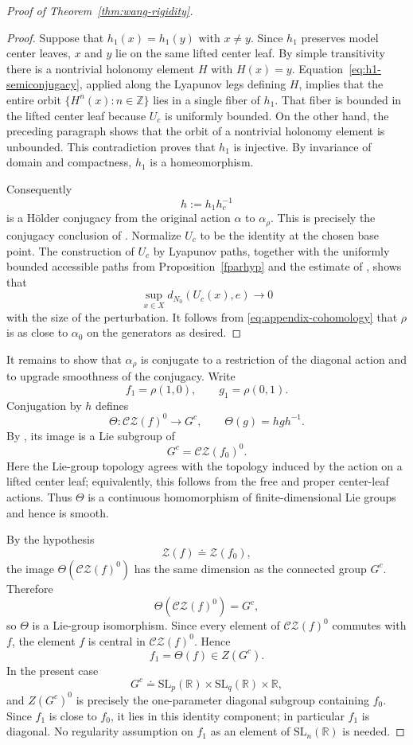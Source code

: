 \documentclass[11pt]{amsart}
\numberwithin{equation}{section}
\newcommand{\CZ}{\mathcal{CZ}}
\newcommand{\SL}{\mathrm{SL}}
\theoremstyle{plain}
\begin{document}
\begin{proof}[Proof of Theorem~\ref{thm:wang-rigidity}]
\begin{proof}
Suppose that $h_1(x)=h_1(y)$ with $x\ne y$.  Since $h_1$ preserves model
center leaves, $x$ and $y$ lie on the same lifted center leaf.  By simple
transitivity there is a nontrivial holonomy element $H$ with $H(x)=y$.
Equation~\eqref{eq:h1-semiconjugacy}, applied along the Lyapunov legs
defining $H$, implies that the entire orbit
$\{H^n(x):n\in\mathbb Z\}$ lies in a single fiber of $h_1$.  That fiber is
bounded in the lifted center leaf because $U_c$ is uniformly bounded.
On the other hand, the preceding paragraph shows that the orbit of a
nontrivial holonomy element is unbounded.  This contradiction proves that
$h_1$ is injective.  By invariance of domain and compactness, $h_1$ is a
homeomorphism.

Consequently
\[
h:=h_1h_c^{-1}
\]
is a H\"older conjugacy from the original action $\alpha$ to
$\alpha_\rho$.  This is precisely the conjugacy conclusion of
\cite[Proposition~6.2]{Wang26}. Normalize $U_c$ to be the
identity at the chosen base point.  The construction of $U_c$ by
Lyapunov paths, together with the uniformly bounded accessible paths from
Proposition~\ref{fparhyp} and the estimate of
\cite[Lemma~6.10]{Wang26}, shows that
\[
\sup_{x\in X}d_{N_0}(U_c(x),e)\longrightarrow0
\]
with the size of the perturbation.  It follows from
\eqref{eq:appendix-cohomology} that $\rho$ is as close to $\alpha_0$ on
the generators as desired.
\end{proof}

It remains to show that $\alpha_\rho$ is conjugate to a restriction of the diagonal action and to upgrade smoothness of the conjugacy.  Write
\[
f_1=\rho(1,0),
\qquad
g_1=\rho(0,1).
\]
Conjugation by $h$ defines
\[
\Theta:\CZ(f)^0\longrightarrow G^c,
\qquad
\Theta(g)=hgh^{-1}.
\]
By \cite[Proposition~6.2]{Wang26}, its image is a Lie subgroup of
\[
G^c=\CZ(f_0)^0.
\]
Here the Lie-group topology agrees with the topology induced by the action
on a lifted center leaf; equivalently, this follows from the free and
proper center-leaf actions.  Thus $\Theta$ is a continuous homomorphism of
finite-dimensional Lie groups and hence is smooth.

By the hypothesis
\[
\mathcal Z(f)\doteq\mathcal Z(f_0),
\]
the image $\Theta(\CZ(f)^0)$ has the same dimension as the connected group
$G^c$.  Therefore
\[
\Theta(\CZ(f)^0)=G^c,
\]
so $\Theta$ is a Lie-group isomorphism.  Since every element of
$\CZ(f)^0$ commutes with $f$, the element $f$ is central in
$\CZ(f)^0$.  Hence
\[
f_1=\Theta(f)\in Z(G^c).
\]
In the present case
\[
G^c\doteq
\SL_p(\mathbb R)\times\SL_q(\mathbb R)\times\mathbb R,
\]
and $Z(G^c)^0$ is precisely the one-parameter diagonal subgroup containing
$f_0$.  Since $f_1$ is close to $f_0$, it lies in this identity component;
in particular $f_1$ is diagonal. 
No regularity assumption on $f_1$ as an element of
$\SL_n(\mathbb R)$ is needed.


\end{proof}
\end{document}
